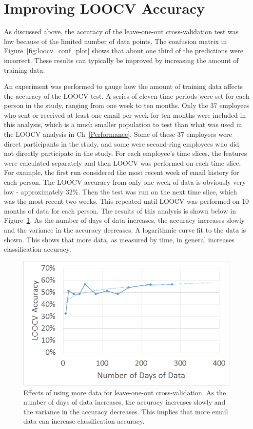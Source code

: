 \documentclass[12pt]{report}
\begin{document}
\section{Improving LOOCV Accuracy}
As discussed above, the accuracy of the leave-one-out cross-validation test was low because of the limited number of data points.
The confusion matrix in Figure~\ref{fig:loocv_conf_plot} shows that about one third of the predictions were incorrect.  
These results can typically be improved by increasing the amount of training data. 

An experiment was performed to gauge how the amount of training data affects the accuracy of the LOOCV test.
A series of eleven time periods were set for each person in the study, ranging from one week to ten months.
Only the 37 employees who sent or received at least one email per week for ten months were included in this analysis, which is a much smaller population to test than what was used in the LOOCV analysis in Ch~\ref{Performance}.
Some of these 37 employees were direct participants in the study, and some were second-ring employees who did not directly participate in the study.
For each employee's time slices, the features were calculated separately and then LOOCV was performed on each time slice.
For example, the first run considered the most recent week of email history for each person.
The LOOCV accuracy from only one week of data is obviously very low - approximately 32\%.
Then the test was run on the next time slice, which was the most recent two weeks.
This repeated until LOOCV was performed on 10 months of data for each person.
The results of this analysis is shown below in Figure~\ref{fig:loocv_generalization}.
As the number of days of data increases, the accuracy increases slowly and the variance in the accuracy decreases.
A logarithmic curve fit to the data is shown.
This shows that more data, as measured by time, in general increases classification accuracy.
\begin{figure}[t]
    \centering
        \includegraphics[width=.7\columnwidth,trim={1mm 2mm 1mm 3.5mm},clip]{generalization}
        \vspace{-7pt}
        \caption[Effects of more data on prediction accuracy]{Effects of using more data for leave-one-out cross-validation.  As the number of days of data increases, the accuracy increases slowly and the variance in the accuracy decreases.  This implies that more email data can increase classification accuracy.}
        \label{fig:loocv_generalization}
\end{figure}
\end{document}
